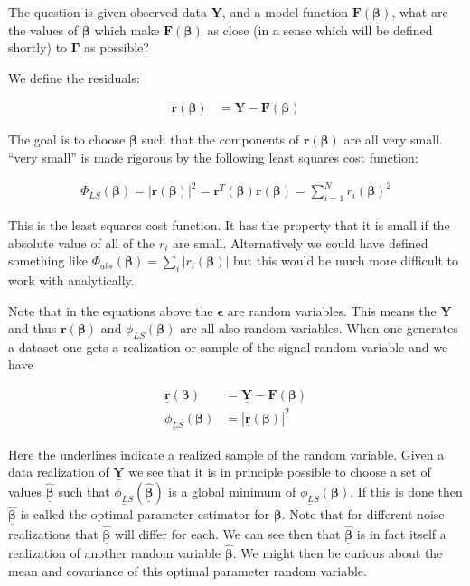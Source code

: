\documentclass[12pt]{article}
\newcommand{\ep}{\epsilon}
\newcommand{\bv}[1]{\boldsymbol{#1}}
\newcommand{\ul}[1]{\underline{#1}}
\begin{document}
The question is given observed data $\bv{Y}$, and a model function $\bv{F}(\bv{\beta})$, what are the values of $\bv{\beta}$ which make $\bv{F}(\bv{\beta})$ as close (in a sense which will be defined shortly) to $\bv{\Gamma}$ as possible?

We define the residuals:

\begin{align}
\bv{r}(\bv{\beta}) &= \bv{Y} - \bv{F}(\bv{\beta})
\end{align}

The goal is to choose $\bv{\beta}$ such that the components of $\bv{r}(\bv{\beta})$ are all very small. 
``very small'' is made rigorous by the following least squares cost function:

\begin{align}
\Phi_{LS}(\bv{\beta}) = |\bv{r}(\bv{\beta})|^2 = \bv{r}^T(\bv{\beta})\bv{r}(\bv{\beta}) = \sum_{i=1}^N r_i(\bv{\beta})^2
\end{align}

This is the least squares cost function. 
It has the property that it is small if the absolute value of all of the $r_i$ are small. 
Alternatively we could have defined something like $\Phi_{abs}(\bv{\beta}) = \sum_i |r_i(\bv{\beta})|$ but this would be much more difficult to work with analytically.

Note that in the equations above the $\bv{\ep}$ are random variables. 
This means the $\bv{Y}$ and thus $\bv{r}(\bv{\beta})$ and $\phi_{LS}(\bv{\beta})$ are all also random variables. 
When one generates a dataset one gets a realization or sample of the signal random variable and we have

\begin{align}
\ul{\bv{r}}(\bv{\beta}) &= \ul{\bv{Y}} - \bv{F}(\bv{\beta})\\
\ul{\phi_{LS}}(\bv{\beta}) &= |\ul{\bv{r}}(\bv{\beta})|^2
\end{align}

Here the underlines indicate a realized sample of the random variable. Given a data realization of $\ul{\bv{Y}}$ we see that it is in principle possible to choose a set of values $\ul{\bv{\hat{\beta}}}$ such that $\ul{\phi_{LS}}(\ul{\bv{\hat{\beta}}})$ is a global minimum of $\ul{\phi_{LS}}(\bv{\beta})$. 
If this is done then $\ul{\bv{\hat{\beta}}}$ is called the optimal parameter estimator for $\bv{\beta}$. 
Note that for different noise realizations that $\ul{\bv{\hat{\beta}}}$ will differ for each. 
We can see then that $\ul{\bv{\hat{\beta}}}$ is in fact itself a realization of another random variable $\bv{\hat{\beta}}$. 
We might then be curious about the mean and covariance of this optimal parameter random variable. 
\end{document}

